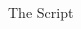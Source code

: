 \documentclass[mathserif]{beamer}
\begin{document}
\begin{frame}{The Script}
  \begin{columns}
    \begin{column}{0.49\linewidth}
      \begin{block}{}
        \scriptsize
        
      \end{block}
    \end{column}
    \begin{column}{0.49\linewidth}
      \begin{block}{}
        \scriptsize
        
      \end{block}
    \end{column}
  \end{columns}
\end{frame}
\end{document}
